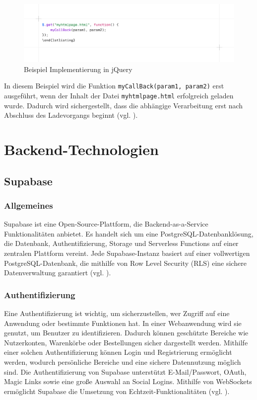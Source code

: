 \documentclass[oneside]{ausarbeitung}
\begin{document}
\begin{figure}[H] %
    \centering
    \includegraphics[width=\linewidth]{images/jqbeispiel.png}
    \caption{Beispiel Implementierung in jQuery}
    \label{fig:bspjq}
\end{figure}

In diesem Beispiel wird die Funktion \texttt{myCallBack(param1, param2)} erst ausgeführt, wenn der Inhalt der Datei \texttt{myhtmlpage.html} erfolgreich geladen wurde. Dadurch wird sichergestellt, dass die abhängige Verarbeitung erst nach Abschluss des Ladevorgangs beginnt (vgl. \parencite{jquery_api}).  

\section{Backend-Technologien}
\subsection{Supabase}
\subsubsection{Allgemeines}
Supabase ist eine Open-Source-Plattform, die Backend-as-a-Service Funktionalitäten anbietet. Es handelt sich um eine PostgreSQL-Datenbanklösung, die Datenbank, Authentifizierung, Storage und Serverless Functions auf einer zentralen Plattform vereint. Jede Supabase-Instanz basiert auf einer vollwertigen PostgreSQL-Datenbank, die mithilfe von Row Level Security (RLS) eine sichere Datenverwaltung garantiert (vgl. \parencite{supabase}).

\subsubsection{Authentifizierung}
Eine Authentifizierung ist wichtig, um sicherzustellen, wer Zugriff auf eine Anwendung oder bestimmte Funktionen hat. In einer Webanwendung wird sie genutzt, um Benutzer zu identifizieren. Dadurch können geschützte Bereiche wie Nutzerkonten, Warenkörbe oder Bestellungen sicher dargestellt werden. Mithilfe einer solchen Authentifizierung können Login und Registrierung ermöglicht werden, wodurch persönliche Bereiche und eine sichere Datennutzung möglich sind.
Die Authentifizierung von Supabase unterstützt E-Mail/Passwort, OAuth, Magic Links sowie eine große Auswahl an Social Logins. Mithilfe von WebSockets ermöglicht Supabase die Umsetzung von Echtzeit-Funktionalitäten (vgl. \parencite{supabase}).
\end{document}
